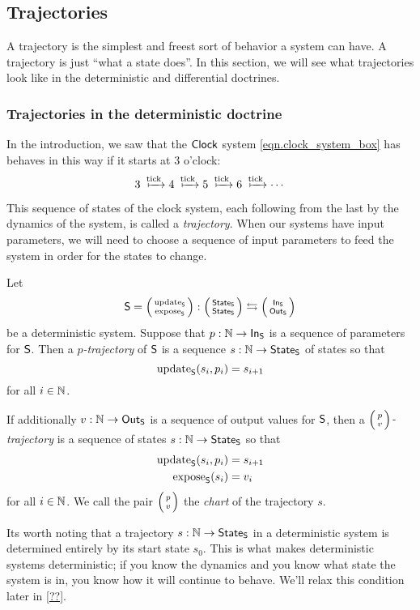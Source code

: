 \documentclass[DynamicalBook]{subfiles}
\begin{document}
\subsection{Trajectories}

A trajectory is the simplest and freest sort of behavior a system can have. A
trajectory is just ``what a state does''. In this section, we will see what
trajectories look like in the deterministic and differential doctrines.

\subsubsection{Trajectories in the deterministic doctrine}\label{sec.trajectory_discrete}
In the introduction, we saw that the $\mathsf{Clock}$ system
\cref{eqn.clock_system_box} has behaves in this way if it starts at $3$ o'clock: 
$$3 \xmapsto{\fun{tick}} 4 \xmapsto{\fun{tick}} 5 \xmapsto{\fun{tick}} 6
\xmapsto{\fun{tick}} \cdots$$

This sequence of states of the clock system, each following from the last by the
dynamics of the system, is called a \emph{trajectory}. When our systems have
input parameters, we will need to choose a sequence of input parameters to feed
the system in order for the states to change.

\begin{definition}\label{def.trajectory_discrete}
 Let $$\Sys{S} = \lens{\update{S}}{\expose{S}} : \lens{\State{S}}{\State{S}}
 \leftrightarrows \lens{\In{S}}{\Out{S}}$$
 be a deterministic system. Suppose that $p : \mathbb{N} \to \mathsf{In}_{\mathsf{S}}$ is a sequence of
 parameters for $\mathsf{S}$. Then a \emph{$p$-trajectory} of $\mathsf{S}$ is a sequence $s : \mathbb{N} \to \mathsf{State}_{\mathsf{S}}$ of states so that
 $$\mathrm{update}_{\mathsf{S}}(s_i, p_i) = s_{i + 1}$$
 for all $i \in \mathbb{N}$.

 If additionally $v : \mathbb{N} \to \mathsf{Out}_{\mathsf{S}}$ is a sequence of output values for $\mathsf{S}$, then a
 \emph{$\lens{p}{v}$-trajectory} is a sequence of states $s : \mathbb{N} \to \mathsf{State}_{\mathsf{S}}$ so
 that
 \begin{align*}
   \mathrm{update}_{\mathsf{S}}(s_i, p_i) &= s_{i + 1}\\
   \mathrm{expose}_{\mathsf{S}}(s_i) &= v_i
 \end{align*}
 for all $i \in \mathbb{N}$. We call the pair $\lens{p}{v}$ the \emph{chart} of the trajectory $s$.
\end{definition}

Its worth noting that a trajectory $s : \mathbb{N} \to \mathsf{State}_{\mathsf{S}}$ in a deterministic system is determined
entirely by its start state $s_0$. This is what makes deterministic systems
deterministic; if you know the dynamics and you know what state the system is
in, you know how it will continue to behave. We'll relax this condition later in \cref{??}.
\end{document}
